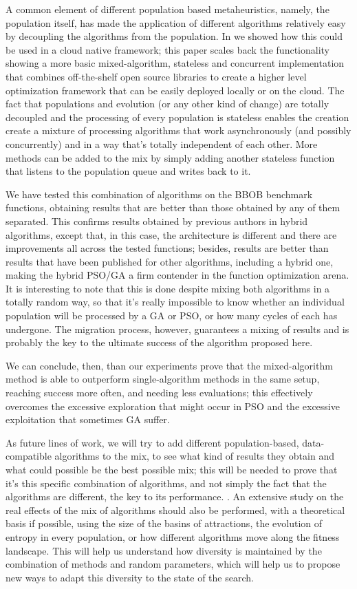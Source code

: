 \documentclass[runningheads]{llncs}
\begin{document}
{A common element of different population based metaheuristics, namely,
the population itself, has made the application of different
algorithms relatively easy by decoupling the algorithms from the
population. In \cite{GARCIAVALDEZ2021234:anon} we showed how this
could be used in a cloud native framework; this paper scales back the
functionality showing a more basic mixed-algorithm, stateless and
concurrent implementation that combines off-the-shelf open source
libraries to create a higher level optimization framework that can be
easily deployed locally or on the cloud. The fact that populations and evolution (or any other kind of
change) are totally decoupled and the processing of every population
is stateless enables the creation create a mixture of processing algorithms that work
asynchronously (and possibly concurrently) and in a way that's totally
independent of each other. More methods can be added to the mix by simply
adding another stateless function that listens to the population queue
and writes back to it.

We have tested this combination of algorithms on the BBOB benchmark
functions, obtaining results that are better than those obtained by
any of them separated. This confirms results obtained by previous
authors in hybrid algorithms, except that, in this case, the
architecture is different and 
there are improvements all across the tested functions; besides,
results are better than results that have been published for other
algorithms, including a hybrid one, making the hybrid PSO/GA a firm
contender in the function optimization arena.
It is interesting to note that this is done despite mixing both
algorithms in a totally random way, so that it's really impossible to
know whether an individual population will be processed by a GA or
PSO, or how many cycles of each has undergone. The migration process,
however, guarantees a mixing of results and is probably the key to the
ultimate success of the algorithm proposed here.

We can conclude, then, than our experiments prove that the mixed-algorithm method is able to
outperform single-algorithm methods in the same setup, reaching
success more often, and needing less evaluations; this effectively
overcomes the excessive exploration that might occur in PSO and the
excessive exploitation that sometimes GA suffer.

As future lines of work, we will try to add different
population-based, data-compatible algorithms to the mix, to see what
kind of results they obtain and what could possible be the best
possible mix; this will be needed to prove that it's this specific
combination of algorithms, and not simply the fact that the algorithms
are different, the key to its performance. . An extensive study on the
real effects of the mix of algorithms should also be performed, with a
theoretical basis if possible, using the size of the basins of
attractions, the evolution of entropy in every population, or how
different algorithms move along the fitness landscape. This will help
us understand how diversity is maintained by the combination of
methods and random parameters, which will help us to propose new ways
to adapt this diversity to the state of the search.

}
\end{document}
